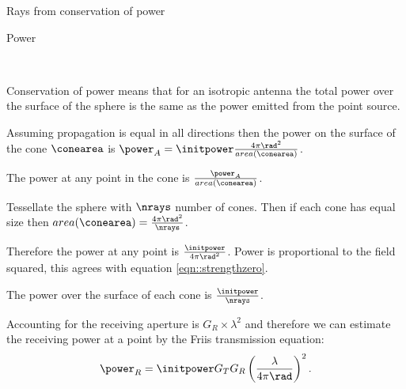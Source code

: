 \documentclass[8pt]{beamer}
\begin{document}
\begin{frame}{Rays from conservation of power}
\begin{block}{Power}
\begin{minipage}{0.8\linewidth}
\begin{minipage}{0.4\linewidth}
\uniformpropagation %
\end{minipage}
\begin{minipage}{0.15\linewidth}
\
\end{minipage}
\begin{minipage}{0.4\linewidth}
\raycone
\end{minipage}
\end{minipage}
\par Conservation of power means that for an isotropic antenna the total power over the surface of the sphere is the same as the power emitted from the point source. 
\end{block}
\end{frame}
\begin{frame}
\begin{block}{}
\par Assuming propagation is equal in all directions then the power 
on the surface of the cone $\conearea$ is $\power_A=\initpower\frac{4\pi \rad^2}{area(\conearea)}$. 
\par The power at any point in the cone is $\frac{\power_A}{area(\conearea)}$.
\end{block}
\begin{block}{}
\begin{minipage}{\linewidth}
\begin{minipage}{0.45\linewidth}
\rayconeDiscrete
\end{minipage}
\begin{minipage}{0.45\linewidth}
\par Tessellate the sphere with $\nrays$ number of cones. Then if each cone has equal size then $area(\conearea)=\frac{4 \pi \rad^2}{\nrays}$. 
\par Therefore the power at any point is $\frac{\initpower}{4\pi \rad^2}$. Power is proportional to the field squared, this agrees with equation \eqref{eqn::strengthzero}.
\par The power over the surface of each cone is $\frac{\initpower}{\nrays}$.
\par Accounting for the receiving aperture is $G_R \times \lambda^2$ and therefore we can estimate the receiving power at a point by the Friis transmission equation:
\begin{equation}
\power_R=\initpower G_T G_R \left( \frac{\lambda}{4 \pi  \rad}\right)^2.
\end{equation}
\end{minipage}
\end{minipage}
\end{block}
\end{frame}
\end{document}
